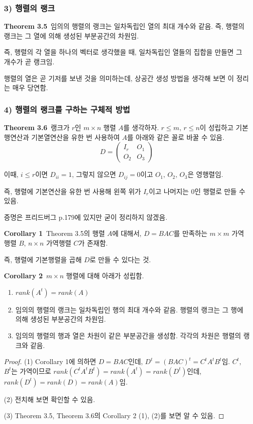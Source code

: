 \documentclass[10pt, a4paper]{article}
\begin{document}
\subsubsection*{3) 행렬의 랭크}
\textbf{Theorem 3.5}\, 임의의 행렬의 랭크는 일차독립인 열의 최대 개수와 같음. 즉, 행렬의 랭크는 그 열에 의해 생성된 부분공간의 차원임.

즉, 행렬의 각 열을 하나의 벡터로 생각했을 때, 일차독립인 열들의 집합을 만들면 그 개수가 곧 랭크임.

행렬의 열은 곧 기저를 보낸 것을 의미하는데, 상공간 생성 방법을 생각해 보면 이 정리는 매우 당연함.

\subsubsection*{4) 행렬의 랭크를 구하는 구체적 방법}
\textbf{Theorem 3.6}\, 랭크가 $r$인 $m \times n$ 행렬 $A$를 생각하자. $r \leq m,\,r \leq n$이 성립하고 기본행연산과 기본열연산을 유한 번 사용하여 $A$를 아래와 같은 꼴로 바꿀 수 있음.
\[
D=
\begin{pmatrix}
I_r & O_1\\
O_2 & O_3
\end{pmatrix}
\]

이때, $i \leq r$이면 $D_{ii}=1$, 그렇지 않으면 $D_{ij}=0$이고 $O_1,\,O_2,\,O_3$은 영행렬임.

즉, 행렬에 기본연산을 유한 번 사용해 왼쪽 위가 $I_r$이고 나머지는 0인 행렬로 만들 수 있음.

증명은 프리드버그 p.179에 있지만 굳이 정리하지 않겠음.

\textbf{Corollary 1}\, Theorem 3.5의 행렬 $A$에 대해서, $D=BAC$를 만족하는 $m \times m$ 가역행렬 $B$, $n \times n$ 가역행렬 $C$가 존재함.

즉, 행렬에 기본행렬을 곱해 $D$로 만들 수 있다는 것.

\textbf{Corollary 2}\, $m \times n$ 행렬에 대해 아래가 성립함.
\begin{enumerate}
    \item $rank(A^t)=rank(A)$
    \item 임의의 행렬의 랭크는 일차독립인 행의 최대 개수와 같음. 행렬의 랭크는 그 행에 의해 생성된 부분공간의 차원임.
    \item 임의의 행렬의 행과 열은 차원이 같은 부분공간을 생성함. 각각의 차원은 행렬의 랭크와 같음.
\end{enumerate}

\begin{proof}
(1) Corollary 1에 의하면 $D=BAC$인데, $D^t=(BAC)^t=C^{t}A^{t}B^{t}$임. $C^{t}$, $B^{t}$는 가역이므로 $rank(C^{t}A^{t}B^{t})=rank(A^{t})=rank(D^t)$인데, $rank(D^t)=rank(D)=rank(A)$임.

(2) 전치해 보면 확인할 수 있음.

(3) Theorem 3.5, Theorem 3.6의 Corollary 2 (1), (2)를 보면 알 수 있음.
\end{proof}
\end{document}
